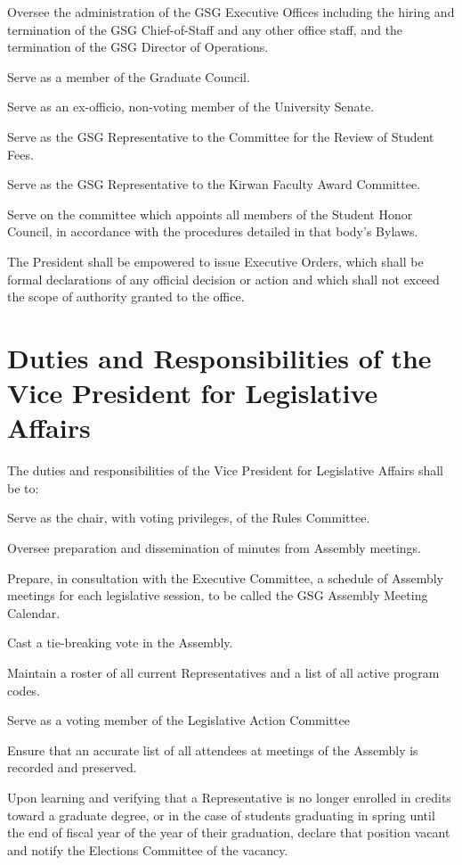 \begin{bylaws-number}
\begin{bylaws-number}
    \item Oversee the administration of the GSG Executive Offices including the hiring and termination of the GSG Chief-of-Staff and any other office staff, and the termination of the GSG Director of Operations.
    \item Serve as a member of the Graduate Council.
    \item Serve as an ex-officio, non-voting member of the University Senate.
    \item Serve as the GSG Representative to the Committee for the Review of Student Fees.
    \item Serve as the GSG Representative to the Kirwan Faculty Award Committee.
    \item Serve on the committee which appoints all members of the Student Honor Council, in accordance with the procedures detailed in that body’s Bylaws.
  \end{bylaws-number}
  \item The President shall be empowered to issue Executive Orders, which shall be formal declarations of any official decision or action and which shall not exceed the scope of authority granted to the office.
\end{bylaws-number}

\section{Duties and Responsibilities of the Vice President for Legislative Affairs}
The duties and responsibilities of the Vice President for Legislative Affairs shall be to:
\begin{bylaws-number}
  \item Serve as the chair, with voting privileges, of the Rules Committee.
  \item Oversee preparation and dissemination of minutes from Assembly meetings.
  \item Prepare, in consultation with the Executive Committee, a schedule of Assembly meetings for each legislative session, to be called the GSG Assembly Meeting Calendar.
  \item Cast a tie-breaking vote in the Assembly.
  \item Maintain a roster of all current Representatives and a list of all active program codes.
  \item Serve as a voting member of the Legislative Action Committee
  \item Ensure that an accurate list of all attendees at meetings of the Assembly is recorded and preserved.
  \item Upon learning and verifying that a Representative is no longer enrolled in credits toward a graduate degree, or in the case of students graduating in spring until the end of fiscal year of the year of their graduation, declare that position vacant and notify the Elections Committee of the vacancy.
\end{bylaws-number}

